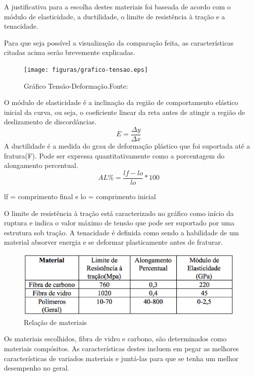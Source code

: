 A justificativa para a escolha destes materiais foi baseada de acordo com o módulo de elasticidade, a ductilidade, o limite de
resistência à tração e a tenacidade. 

Para que seja possível a visualização da comparação feita, as características citadas acima serão brevemente explicadas.


\begin{figure}[H]
    \centering
      \texttt{[image: figuras/grafico-tensao.eps]}
    \caption{Gráfico Tensão-Deformação.Fonte: \cite{callister}}
    \label{fig:grafico-tensao}
\end{figure}

O módulo de elasticidade é a inclinação da região de comportamento elástico inicial da curva, ou seja, o coeficiente linear da reta antes de atingir a região de deslizamento de discordâncias.
\begin{equation}
E =\frac{\Delta y}{\Delta x}
\end{equation}
A ductilidade é a medida do grau de deformação plástico que foi suportada até a fratura(F). Pode ser expressa quantitativamente como a porcentagem do alongamento percentual.
\begin{equation}
AL\% =\frac{lf - lo}{lo} * 100
\end{equation}
\begin{center}
lf = comprimento final e lo = comprimento inicial
\end{center}

O limite de resistência à tração está caracterizado no gráfico como início da ruptura e indica o valor máximo de tensão que pode ser suportado por uma estrutura sob tração.
A tenacidade é definida como sendo a habilidade de um material absorver energia e se deformar plasticamente antes de fraturar.

\begin{figure}[h]
    \centering
      \includegraphics[keepaspectratio=true,scale=0.7]{figuras/graficoRelacao.eps}
    \caption{ Relação de materiais}
    \label{fig:graficoRelacao}
\end{figure}

Os materiais escolhidos, fibra de vidro e carbono, são determinados como materiais compósitos.
As características destes incluem em pegar as melhores características de variados materiais e juntá-las para que se tenha um 
melhor desempenho no geral. 

